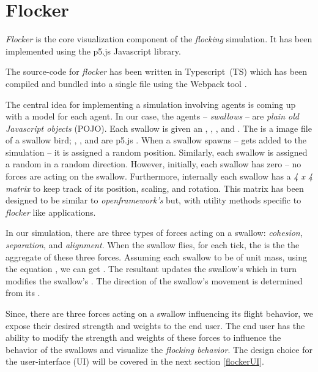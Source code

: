 \documentclass[../main]{subfiles}
\begin{document}
\section{Flocker}
\label{flocker}

{\em Flocker} \cite{flockerApp} is the core visualization component of the {\em flocking} simulation. It has been implemented using the p5.js\cite{p5js} Javascript library.

The source-code \cite{flockerSrc} for {\em flocker} has been written in \mbox{Typescript}~(TS) \cite{ts} which has been compiled and bundled into a single  file using the \mbox{Webpack} tool \cite{wbpack}.

The central idea for implementing a simulation involving agents is coming up with a model for each agent. In our case, the agents -- {\em swallows} -- are {\em plain old Javascript objects} (POJO). Each swallow is given an , , , and . The  is a  image file of a swallow bird; , , and  are p5.js . When a swallow spawns -- gets added to the simulation -- it is assigned a random position. Similarly, each swallow is assigned a random  in a random direction. However, initially, each swallow has zero  -- no forces are acting on the swallow. Furthermore, internally each swallow has a {\em 4 x 4 matrix} to keep track of its position, scaling, and rotation. This matrix has been designed to be similar to {\em openframework's}  but, with utility methods specific to {\em flocker} like applications.

In our simulation, there are three types of forces acting on a swallow: {\em cohesion}, {\em separation}, and {\em alignment}. When the swallow flies, for each tick, the  is the the aggregate of these three forces. Assuming each swallow to be of unit mass, using the equation , we can get . The resultant  updates the swallow's  which in turn modifies the swallow's . The direction of the swallow's movement is determined from its .

Since, there are three forces acting on a swallow influencing its flight behavior, we expose their desired strength and weights to the end user. The end user has the ability to modify the strength and weights of these forces to influence the behavior of the swallows and visualize the {\em flocking behavior}. The design choice for the user-interface (UI) will be covered in the next section \ref{flockerUI}.
\end{document}
